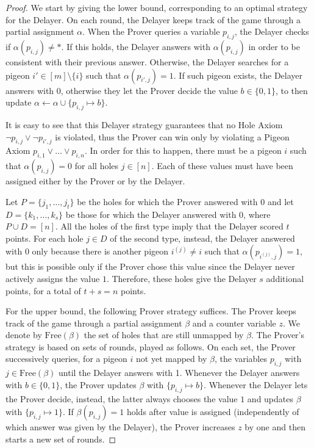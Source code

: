 \begin{proof}
    We start by giving the lower bound, corresponding to an optimal strategy for the Delayer. On each round, the Delayer keeps track of the game through a partial assignment $\alpha$. When the Prover queries a variable $p_{i,j}$, the Delayer checks if $\alpha(p_{i,j}) \neq *$. If this holds, the Delayer answers with $\alpha(p_{i,j})$ in order to be consistent with their previous answer. Otherwise, the Delayer searches for a pigeon $i' \in [m] \setminus \{i\}$ such that $\alpha(p_{i',j}) = 1$. If such pigeon exists, the Delayer answers with $0$, otherwise they let the Prover decide the value $b \in \{0,1\}$, to then update $\alpha \gets \alpha \cup \{p_{i,j} \mapsto b\}$.

    It is easy to see that this Delayer strategy guarantees that no Hole Axiom $\lnot p_{i,j} \lor \lnot p_{i',j}$ is violated, thus the Prover can win only by violating a Pigeon Axiom $p_{i,1} \lor \ldots \lor p_{i,n}$. In order for this to happen, there must be a pigeon $i$ such that $\alpha(p_{i,j}) = 0$ for all holes $j \in [n]$. Each of these values must have been assigned either by the Prover or by the Delayer.

    Let $P = \{j_1, \ldots,j_t\}$ be the holes for which the Prover answered with $0$ and let $D = \{k_1, \ldots, k_s\}$ be those for which the Delayer answered with $0$, where $P \cup D = [n]$. All the holes of the first type imply that the Delayer scored $t$ points. For each hole $j \in D$ of the second type, instead, the Delayer answered with $0$ only because there is another pigeon $i^{(j)} \neq i$ such that $\alpha(p_{i^{(j)},j}) = 1$, but this is possible only if the Prover chose this value since the Delayer never actively assigns the value $1$. Therefore, these holes give the Delayer $s$ additional points, for a total of $t+s = n$ points. 

    For the upper bound, the following Prover strategy suffices. The Prover keeps track of the game through a partial assignment $\beta$ and a counter variable $z$. We denote by $\mathrm{Free}(\beta)$ the set of holes that are still unmapped by $\beta$. The Prover's strategy is based on sets of rounds, played as follows. On each set, the Prover successively queries, for a pigeon $i$ not yet mapped by $\beta$, the variables $p_{i,j}$ with $j \in \mathrm{Free}(\beta)$ until the Delayer answers with 1. Whenever the Delayer answers with $b \in \{0,1\}$, the Prover updates $\beta$ with $\{p_{i,j} \mapsto b\}$. Whenever the Delayer lets the Prover decide, instead, the latter always chooses the value $1$ and updates $\beta$ with $\{p_{i,j} \mapsto 1\}$. If $\beta(p_{i,j}) =1$ holds after value is assigned (independently of which answer was given by the Delayer), the Prover increases $z$ by one and then starts a new set of rounds.


\end{proof}
